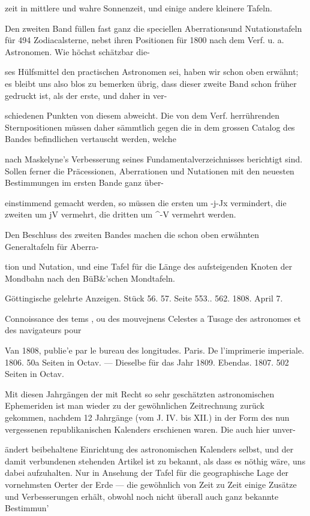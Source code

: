 \documentclass[10pt,a4paper]{article}
\begin{document}
zeit in mittlere und wahre Sonnenzeit, und einige andere kleinere Tafeln.

Den zweiten Band füllen fast ganz die speciellen Aberrationsund Nutationstafeln für 494 Zodiacalsterne, nebst ihren Positionen für 1800 nach dem Verf. u. a. Astronomen. Wie höchst schätzbar die-

ses Hülfsmittel den practischen Astronomen sei, haben wir schon oben erwähnt; es bleibt uns also blos zu bemerken übrig, dass dieser zweite Band schon früher gedruckt ist, als der erste, und daher in ver-

schiedenen Punkten von diesem abweicht. Die von dem Verf. herrührenden Sternpositionen müssen daher sämmtlich gegen die in dem grossen Catalog des Bandes befindlichen vertauscht werden, welche

nach Maskelyne's Verbesserung seines Fundamentalverzeichnisses berichtigt sind. Sollen ferner die Präcessionen, Aberrationen und Nutationen mit den neuesten Bestimmungen im ersten Bande ganz über-

einstimmend gemacht werden, so müssen die ersten um -j-Jx vermindert, die zweiten um jV vermehrt, die dritten um \textasciicircum{}-V vermehrt werden.

Den Beschluss des zweiten Bandes machen die schon oben erwähnten Generaltafeln für Aberra-

tion und Nutation, und eine Tafel für die Länge des aufsteigenden Knoten der Mondbahn nach den BüB\&'schen Mondtafeln.

Göttingische gelehrte Anzeigen. Stück 56. 57. Seite 553.. 562. 1808. April 7.

Connoissance des tems , ou des mouvejnens Celestes a Tusage des astronomes et des navigateurs pour

Van 1808, publie'e par le bureau des longitudes. Paris. De l'imprimerie imperiale. 1806. 50a Seiten in Octav. — Dieselbe für das Jahr 1809. Ebendas. 1807. 502 Seiten in Octav.

Mit diesen Jahrgängen der mit Recht so sehr geschätzten astronomischen Ephemeriden ist man wieder zu der gewöhnlichen Zeitrechnung zurück gekommen, nachdem 12 Jahrgänge (vom J. IV. bis XII.) in der Form des nun vergessenen republikanischen Kalenders erschienen waren. Die auch hier unver-

ändert beibehaltene Einrichtung des astronomischen Kalenders selbst, und der damit verbundenen stehenden Artikel ist zu bekannt, als dass es nöthig wäre, uns dabei aufzuhalten. Nur in Ansehung der Tafel für die geographische Lage der vornehmsten Oerter der Erde — die gewöhnlich von Zeit zu Zeit einige Zusätze und Verbesserungen erhält, obwohl noch nicht überall auch ganz bekannte Bestimmun'
\end{document}
